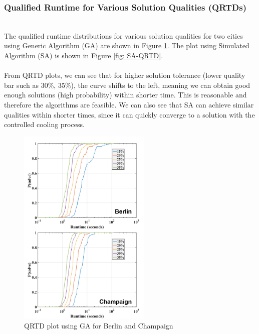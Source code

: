 \subsubsection{Qualified Runtime for Various Solution Qualities (QRTDs)}
\hfill\\
The qualified runtime distributions for various solution qualities for two cities using Generic Algorithm (GA) are shown in Figure \ref{fig: GA-QRTD}. The plot using Simulated Algorithm (SA) is shown in Figure \ref{fig: SA-QRTD}.\\
\hfill\\
From QRTD plots, we can see that for higher solution tolerance (lower quality bar such as 30\%, 35\%), the curve shifts to the left, meaning we can obtain good enough solutions (high probability) within shorter time. This is reasonable and therefore the algorithms are feasible. We can also see that SA can achieve similar qualities within shorter times, since it can quickly converge to a solution with the controlled cooling process.  






\begin{figure}
\includegraphics[width=2.5in]{F1-GA-QRTD}
\caption{QRTD plot using GA for Berlin and Champaign}
\label{fig: GA-QRTD}
\end{figure}


